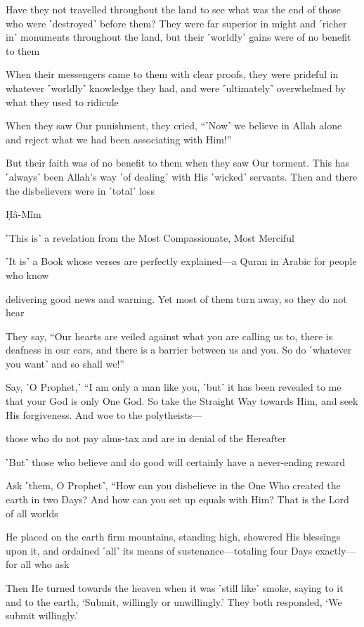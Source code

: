 Have they not travelled throughout the land to see what was the end of those who were ˹destroyed˺ before them? They were far superior in might and ˹richer in˺ monuments throughout the land, but their ˹worldly˺ gains were of no benefit to them

When their messengers came to them with clear proofs, they were prideful in whatever ˹worldly˺ knowledge they had, and were ˹ultimately˺ overwhelmed by what they used to ridicule

When they saw Our punishment, they cried, “˹Now˺ we believe in Allah alone and reject what we had been associating with Him!”

But their faith was of no benefit to them when they saw Our torment. This has ˹always˺ been Allah’s way ˹of dealing˺ with His ˹wicked˺ servants. Then and there the disbelievers were in ˹total˺ loss

Ḥâ-Mĩm

˹This is˺ a revelation from the Most Compassionate, Most Merciful

˹It is˺ a Book whose verses are perfectly explained—a Quran in Arabic for people who know

delivering good news and warning. Yet most of them turn away, so they do not hear

They say, “Our hearts are veiled against what you are calling us to, there is deafness in our ears, and there is a barrier between us and you. So do ˹whatever you want˺ and so shall we!”

Say, ˹O Prophet,˺ “I am only a man like you, ˹but˺ it has been revealed to me that your God is only One God. So take the Straight Way towards Him, and seek His forgiveness. And woe to the polytheists—

those who do not pay alms-tax and are in denial of the Hereafter

˹But˺ those who believe and do good will certainly have a never-ending reward

Ask ˹them, O Prophet˺, “How can you disbelieve in the One Who created the earth in two Days? And how can you set up equals with Him? That is the Lord of all worlds

He placed on the earth firm mountains, standing high, showered His blessings upon it, and ordained ˹all˺ its means of sustenance—totaling four Days exactly—for all who ask

Then He turned towards the heaven when it was ˹still like˺ smoke, saying to it and to the earth, ‘Submit, willingly or unwillingly.’ They both responded, ‘We submit willingly.’

